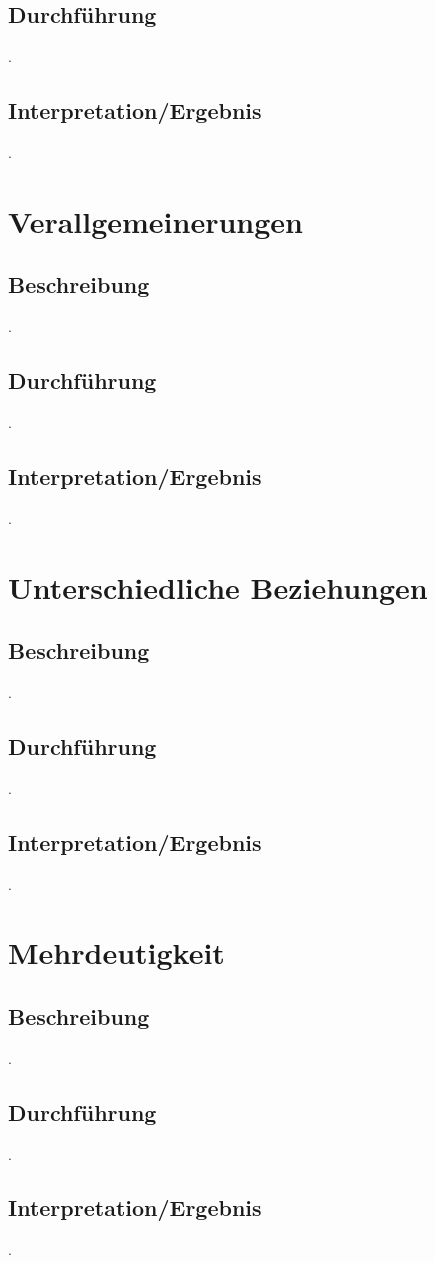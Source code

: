 \documentclass[12pt,a4paper]{report}
\begin{document}
		\subsection{Durchführung}
		.
		\subsection{Interpretation/Ergebnis}
		.
	\newpage
	\section{Verallgemeinerungen}
		\subsection{Beschreibung}
		.
		\subsection{Durchführung}
		.
		\subsection{Interpretation/Ergebnis}
		.
	\newpage
	\section{Unterschiedliche Beziehungen}
		\subsection{Beschreibung}
		.
		\subsection{Durchführung}
		.
		\subsection{Interpretation/Ergebnis}
		.
	\newpage
	\section{Mehrdeutigkeit}
		\subsection{Beschreibung}
		.
		\subsection{Durchführung}
		.
		\subsection{Interpretation/Ergebnis}
		.
		
\end{document}
